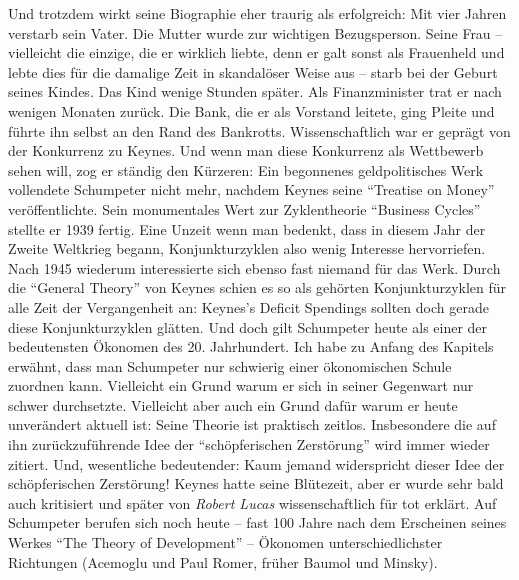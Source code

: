 Und trotzdem wirkt seine Biographie eher traurig als erfolgreich: Mit vier Jahren verstarb sein Vater. Die Mutter wurde zur wichtigen Bezugsperson. Seine Frau -- vielleicht die einzige, die er wirklich liebte, denn er galt sonst als Frauenheld und lebte dies für die damalige Zeit in skandalöser Weise aus -- starb bei der Geburt seines Kindes. Das Kind wenige Stunden später. 
Als Finanzminister trat er nach wenigen Monaten zurück. Die Bank, die er als Vorstand leitete, ging Pleite und führte ihn selbst an den Rand des Bankrotts. Wissenschaftlich war er geprägt von der Konkurrenz zu Keynes. Und wenn man diese Konkurrenz als Wettbewerb sehen will, zog er ständig den Kürzeren: Ein begonnenes geldpolitisches Werk vollendete Schumpeter nicht mehr, nachdem Keynes seine "`Treatise on Money"' veröffentlichte. Sein monumentales Wert zur Zyklentheorie "`Business Cycles"' stellte er 1939 fertig. Eine Unzeit wenn man bedenkt, dass in diesem Jahr der Zweite Weltkrieg begann, Konjunkturzyklen also wenig Interesse hervorriefen. Nach 1945 wiederum interessierte sich ebenso fast niemand für das Werk. Durch die "`General Theory"' von Keynes schien es so als gehörten Konjunkturzyklen für alle Zeit der Vergangenheit an: Keynes's Deficit Spendings sollten doch gerade diese Konjunkturzyklen glätten.
Und doch gilt Schumpeter heute als einer der bedeutensten Ökonomen des 20. Jahrhundert. Ich habe zu Anfang des Kapitels erwähnt, dass man Schumpeter nur schwierig einer ökonomischen Schule zuordnen kann. Vielleicht ein Grund warum er sich in seiner Gegenwart nur schwer durchsetzte. Vielleicht aber auch ein Grund dafür warum er heute unverändert aktuell ist: Seine Theorie ist praktisch zeitlos. Insbesondere die auf ihn zurückzuführende Idee der "`schöpferischen Zerstörung"' wird immer wieder zitiert. Und, wesentliche bedeutender: Kaum jemand widerspricht dieser Idee der schöpferischen Zerstörung! Keynes hatte seine Blütezeit, aber er wurde sehr bald auch kritisiert und später von \textit{Robert Lucas} wissenschaftlich für tot erklärt. Auf Schumpeter berufen sich noch heute -- fast 100 Jahre nach dem Erscheinen seines Werkes "`The Theory of Development"' -- Ökonomen unterschiedlichster Richtungen (Acemoglu und Paul Romer, früher Baumol und Minsky).
